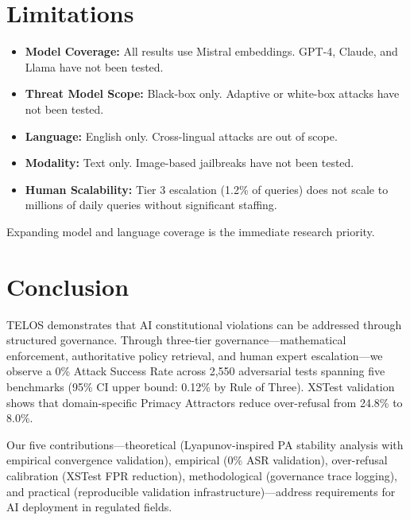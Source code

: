 \documentclass[11pt,twocolumn]{article}
\begin{document}
\section{Limitations}

\begin{itemize}
    \item \textbf{Model Coverage:} All results use Mistral embeddings. GPT-4, Claude, and Llama have not been tested.
    \item \textbf{Threat Model Scope:} Black-box only. Adaptive or white-box attacks have not been tested.
    \item \textbf{Language:} English only. Cross-lingual attacks are out of scope.
    \item \textbf{Modality:} Text only. Image-based jailbreaks have not been tested.
    \item \textbf{Human Scalability:} Tier 3 escalation (1.2\% of queries) does not scale to millions of daily queries without significant staffing.
\end{itemize}

Expanding model and language coverage is the immediate research priority.

\section{Conclusion}

TELOS demonstrates that AI constitutional violations can be addressed through structured governance. Through three-tier governance---mathematical enforcement, authoritative policy retrieval, and human expert escalation---we observe a 0\% Attack Success Rate across 2,550 adversarial tests spanning five benchmarks (95\% CI upper bound: 0.12\% by Rule of Three). XSTest validation shows that domain-specific Primacy Attractors reduce over-refusal from 24.8\% to 8.0\%.

Our five contributions---theoretical (Lyapunov-inspired PA stability analysis with empirical convergence validation), empirical (0\% ASR validation), over-refusal calibration (XSTest FPR reduction), methodological (governance trace logging), and practical (reproducible validation infrastructure)---address requirements for AI deployment in regulated fields.
\end{document}
